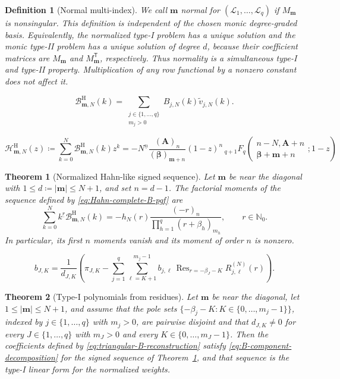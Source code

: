 \documentclass[10pt,a4paper]{amsart}
\newtheorem{definition}{Definition}
\newtheorem{theorem}{Theorem}
\newcommand{\A}{\boldsymbol A}
\newcommand{\Nzero}{\mathbb N_0}
\DeclareMathOperator*{\Res}{Res}
\newcommand{\abs}[1]{\lvert#1\rvert}
\newcommand{\bbeta}{\boldsymbol\beta}
\newcommand{\fall}[2]{#1^{\underline{#2}}}
\newcommand{\mm}{\boldsymbol m}
\newcommand{\pFq}[5]{{}_{#1}F_{#2}\!\left(\begin{matrix}#3\\#4\end{matrix};#5\right)}
\begin{document}
\begin{definition}[Normal multi-index]
\label{def:normal-multi-index}
We call \(\mm\) \emph{normal} for
\((\mathcal L_1,\ldots,\mathcal L_q)\) if \(M_{\mm}\) is nonsingular.
This definition is independent of the chosen monic degree-graded basis.
Equivalently, the normalized type-I problem has a unique solution and the
monic type-II problem has a unique solution of degree \(d\), because their
coefficient matrices are \(M_{\mm}\) and \(M_{\mm}^{\mathsf T}\),
respectively. Thus normality is a simultaneous type-I and type-II
property. Multiplication of any row functional by a nonzero constant does
not affect it.
\end{definition}

\begin{equation}
 \mathcal B_{\mm,N}^{\mathrm H}(k)
 =\sum_{\substack{j\in\{1,\ldots,q\}\\m_j>0}}
 B_{j,N}(k)\widetilde v_{j,N}(k).
 \label{eq:B-component-decomposition}
\end{equation}

\begin{equation}
 \mathcal H^{\mathrm H}_{\mm,N}(z)
 \coloneq\sum_{k=0}^N\mathcal B_{\mm,N}^{\mathrm H}(k)z^k
 =-\fall{N}{n}\frac{(\A)_n}{(\bbeta)_{\mm+n}}(1-z)^n
 \,\pFq{q+1}{q}{n-N,\A+n}{\bbeta+\mm+n}{1-z}
 \label{eq:Hahn-complete-B-pgf}
\end{equation}

\begin{theorem}[Normalized Hahn-like signed sequence]
\label{thm:Hahn-complete-B}
Let \(\mm\) be near the diagonal with
\(1\le d\coloneq\abs\mm\le N+1\), and set \(n=d-1\). The
factorial moments of the sequence defined by
\eqref{eq:Hahn-complete-B-pgf} are
\begin{equation}
 \sum_{k=0}^N\fall{k}{r}\mathcal B_{\mm,N}^{\mathrm H}(k)
 =-h_N(r)\frac{(-r)_n}
 {\prod_{h=1}^q(r+\beta_h)_{m_h}},
 \qquad r\in\Nzero.
 \label{eq:Hahn-complete-B-moments}
\end{equation}
In particular, its first \(n\) moments vanish and its moment of order \(n\)
is nonzero.
\end{theorem}

\begin{equation}
 b_{J,K}=\frac{1}{d_{J,K}}
 \left(\pi_{J,K}-
 \sum_{j=1}^q\sum_{\ell=K+1}^{m_j-1}
 b_{j,\ell}\,
 \Res_{r=-\beta_J-K}R_{j,\ell}^{(N)}(r)\right).
 \label{eq:triangular-B-reconstruction}
\end{equation}

\begin{theorem}[Type-I polynomials from residues]
\label{thm:Hahn-B-components}
Let \(\mm\) be near the diagonal, let \(1\le\abs\mm\le N+1\), and assume
that the pole sets
\(\{-\beta_j-K:K\in\{0,\ldots,m_j-1\}\}\), indexed by
\(j\in\{1,\ldots,q\}\) with \(m_j>0\), are pairwise disjoint and that
\(d_{J,K}\ne0\) for every \(J\in\{1,\ldots,q\}\) with \(m_J>0\) and
every \(K\in\{0,\ldots,m_J-1\}\). Then the coefficients
defined by \eqref{eq:triangular-B-reconstruction} satisfy
\eqref{eq:B-component-decomposition} for the signed sequence of
Theorem~\ref{thm:Hahn-complete-B}, and that sequence is the type-I linear
form for the normalized weights.
\end{theorem}
\end{document}
